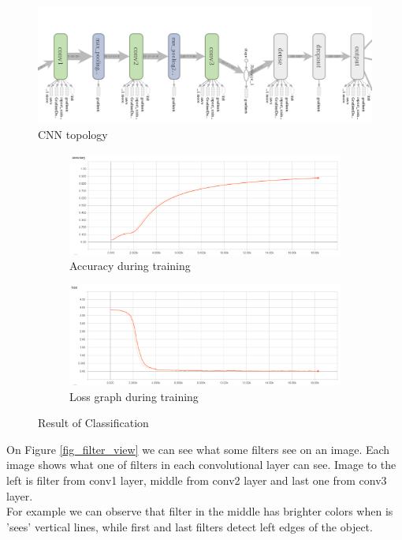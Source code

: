 \documentclass[Report.tex]{subfiles}
\begin{document}
\begin{figure}[!htb]
\includegraphics[width=\textwidth]{res/topology.png}
\caption{CNN topology}
\label{fig_topology}
\end{figure}

\begin{figure}[!htb]
  \begin{subfigure}[t]{\textwidth}
    \centering
    \includegraphics[width=\textwidth]{res/accuracy.png}
    \caption{Accuracy during training}
    \label{fig_accuracy}
  \end{subfigure}
  \begin{subfigure}[t]{\textwidth}
    \centering
    \includegraphics[width=\textwidth]{res/loss.png}
    \caption{Loss graph during training}
    \label{fig_loss}
  \end{subfigure}
  \caption{Result of Classification}
  \label{fig:Character_segmentation}
\end{figure}

On Figure \ref{fig_filter_view} we can see what some filters see on an image. Each image shows what one of filters in each convolutional layer can see. Image to the left is filter from conv1 layer, middle from conv2 layer and last one from conv3 layer.\\
For example we can observe that filter in the middle has brighter colors when is 'sees' vertical lines, while first and last filters detect left edges of the object.
\end{document}
